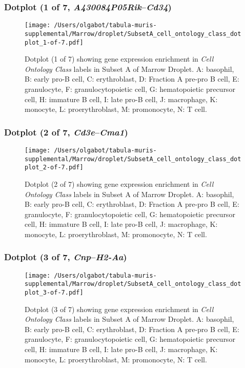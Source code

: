 \clearpage

\subsubsection{Dotplot (1 of 7, \emph{A430084P05Rik}--\emph{Cd34})}
\begin{figure}[h]
\centering
\texttt{[image: /Users/olgabot/tabula-muris-supplemental/Marrow/droplet/SubsetA\_cell\_ontology\_class\_dotplot\_1-of-7.pdf]}

\caption{ Dotplot (1 of 7)  showing gene expression enrichment in \emph{Cell Ontology Class} labels in Subset A of Marrow Droplet. A: basophil, B: early pro-B cell, C: erythroblast, D: Fraction A pre-pro B cell, E: granulocyte, F: granulocytopoietic cell, G: hematopoietic precursor cell, H: immature B cell, I: late pro-B cell, J: macrophage, K: monocyte, L: proerythroblast, M: promonocyte, N: T cell.}
\end{figure}


\clearpage

\subsubsection{Dotplot (2 of 7, \emph{Cd3e}--\emph{Cma1})}
\begin{figure}[h]
\centering
\texttt{[image: /Users/olgabot/tabula-muris-supplemental/Marrow/droplet/SubsetA\_cell\_ontology\_class\_dotplot\_2-of-7.pdf]}

\caption{ Dotplot (2 of 7)  showing gene expression enrichment in \emph{Cell Ontology Class} labels in Subset A of Marrow Droplet. A: basophil, B: early pro-B cell, C: erythroblast, D: Fraction A pre-pro B cell, E: granulocyte, F: granulocytopoietic cell, G: hematopoietic precursor cell, H: immature B cell, I: late pro-B cell, J: macrophage, K: monocyte, L: proerythroblast, M: promonocyte, N: T cell.}
\end{figure}


\clearpage

\subsubsection{Dotplot (3 of 7, \emph{Cnp}--\emph{H2-Aa})}
\begin{figure}[h]
\centering
\texttt{[image: /Users/olgabot/tabula-muris-supplemental/Marrow/droplet/SubsetA\_cell\_ontology\_class\_dotplot\_3-of-7.pdf]}

\caption{ Dotplot (3 of 7)  showing gene expression enrichment in \emph{Cell Ontology Class} labels in Subset A of Marrow Droplet. A: basophil, B: early pro-B cell, C: erythroblast, D: Fraction A pre-pro B cell, E: granulocyte, F: granulocytopoietic cell, G: hematopoietic precursor cell, H: immature B cell, I: late pro-B cell, J: macrophage, K: monocyte, L: proerythroblast, M: promonocyte, N: T cell.}
\end{figure}



